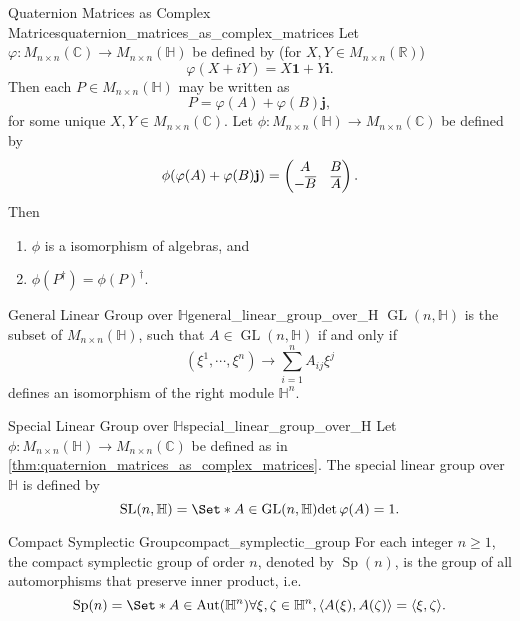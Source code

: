 \documentclass{article}
\begin{document}
\begin{theorem}{Quaternion Matrices as Complex Matrices}{quaternion_matrices_as_complex_matrices}
    Let $\varphi: M_{n\times n}(\mathbb{C}) \rightarrow M_{n\times n}(\mathbb{H})$ be defined by (for $X,Y\in M_{n\times n}(\mathbb{R})$)
    \[ \varphi(X+iY) = X\mathbf{1} + Y\mathbf{i}. \]
    Then each $P\in M_{n\times n}(\mathbb{H})$ may be written as
    \[ P = \varphi(A) + \varphi(B)\mathbf{j}, \]
    for some unique $X,Y\in M_{n\times n}(\mathbb{C})$.
    Let $\phi: M_{n\times n}(\mathbb{H}) \rightarrow M_{n\times n}(\mathbb{C})$ be defined by
    \[ \phi\qty(\varphi(A) + \varphi(B)\mathbf{j}) = \begin{pmatrix}
        A & B \\ -\overline{B} & \overline{A}
    \end{pmatrix}. \]
    Then
    \begin{enumerate}
        \item $\phi$ is a isomorphism of algebras, and
        \item $\phi(P^\dagger) = \phi(P)^\dagger$.
    \end{enumerate}
\end{theorem}

\begin{definition}{General Linear Group over $\mathbb{H}$}{general_linear_group_over_H}
    $\operatorname{GL}(n,\mathbb{H})$ is the subset of $M_{n\times n}(\mathbb{H})$, such that $A\in \operatorname{GL}(n,\mathbb{H})$ if and only if
    \[ (\xi^1,\cdots,\xi^n) \rightarrow \sum_{i=1}^n A_{ij} \xi^j \]
    defines an isomorphism of the right module $\mathbb{H}^n$.
\end{definition}

\begin{definition}{Special Linear Group over $\mathbb{H}$}{special_linear_group_over_H}
    Let $\phi: M_{n\times n}(\mathbb{H}) \rightarrow M_{n\times n}(\mathbb{C})$ be defined as in \cref{thm:quaternion_matrices_as_complex_matrices}.
    The special linear group over $\mathbb{H}$ is defined by
    \[ \operatorname{SL}(n,\mathbb{H}) = \Set*{A\in\operatorname{GL}(n,\mathbb{H})}{\det \varphi(A) = 1}. \]
\end{definition}

\begin{definition}{Compact Symplectic Group}{compact_symplectic_group}
    For each integer $n\ge 1$, the compact symplectic group of order $n$, denoted by $\operatorname{Sp}(n)$, is the group of all automorphisms that preserve inner product, i.e.
    \[ \operatorname{Sp}(n) = \Set*{A\in\operatorname{Aut}(\mathbb{H}^n)}{\forall \xi,\zeta\in\mathbb{H}^n, \langle A(\xi), A(\zeta) \rangle = \langle \xi,\zeta \rangle}. \]
\end{definition}
\end{document}
